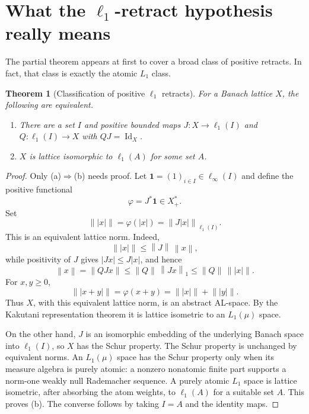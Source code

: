 \documentclass[11pt]{article}
\newtheorem{theorem}{Theorem}[section]
\newcommand{\Id}{\operatorname{Id}}
\newcommand{\norm}[1]{\left\lVert #1\right\rVert}
\begin{document}
\section{What the $\ell_1$-retract hypothesis really means}

The partial theorem appears at first to cover a broad class of positive
retracts.  In fact, that class is exactly the atomic $L_1$ class.

\begin{theorem}[Classification of positive $\ell_1$ retracts]\label{thm:classify}
For a Banach lattice $X$, the following are equivalent.
\begin{enumerate}[label=(\alph*),leftmargin=2.2em]
\item There are a set $I$ and positive bounded maps
$J:X\to\ell_1(I)$ and $Q:\ell_1(I)\to X$ with $QJ=\Id_X$.
\item $X$ is lattice isomorphic to $\ell_1(A)$ for some set $A$.
\end{enumerate}
\end{theorem}

\begin{proof}
Only (a)$\Rightarrow$(b) needs proof.  Let
$\mathbf 1=(1)_{i\in I}\in\ell_\infty(I)$ and define the positive functional
\[
 \varphi=J^*\mathbf 1\in X^*_+.
\]
Set
\[
 \lVert\!\lvert x\rvert\!\rVert=\varphi(|x|)=\norm{J|x|}_{\ell_1(I)}.
\]
This is an equivalent lattice norm.  Indeed,
\[
 \lVert\!\lvert x\rvert\!\rVert
 \leq \norm J\,\norm x,
\]
while positivity of $J$ gives $|Jx|\leq J|x|$, and hence
\[
 \norm x=\norm{QJx}
 \leq \norm Q\,\norm{Jx}_1
 \leq \norm Q\,\lVert\!\lvert x\rvert\!\rVert.
\]
For $x,y\geq0$,
\[
 \lVert\!\lvert x+y\rvert\!\rVert
 =\varphi(x+y)
 =\lVert\!\lvert x\rvert\!\rVert+
  \lVert\!\lvert y\rvert\!\rVert.
\]
Thus $X$, with this equivalent lattice norm, is an abstract AL-space.  By the
Kakutani representation theorem it is lattice isometric to an $L_1(\mu)$
space.

On the other hand, $J$ is an isomorphic embedding of the underlying Banach
space into $\ell_1(I)$, so $X$ has the Schur property.  The Schur property is
unchanged by equivalent norms.  An $L_1(\mu)$ space has the Schur property
only when its measure algebra is purely atomic: a nonzero nonatomic finite
part supports a norm-one weakly null Rademacher sequence.  A purely atomic
$L_1$ space is lattice isometric, after absorbing the atom weights, to
$\ell_1(A)$ for a suitable set $A$.  This proves (b).  The converse follows by
taking $I=A$ and the identity maps.
\end{proof}
\end{document}
